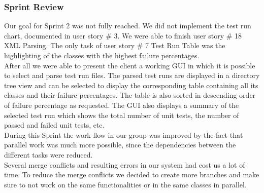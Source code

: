 \subsubsection*{Sprint Review}

Our goal for Sprint 2 was not fully reached. We did not implement the test run chart, documented in user story \# 3. We were able to finish user story \# 18 XML Parsing. The only task of user story \# 7 Test Run Table was the highlighting of the classes with the highest failure percentages. \\ 

After all we were able to present the client a working GUI in which it is possible to select and parse test run files. The parsed test runs are displayed in a directory tree view and can be selected to display the corresponding table containing all its classes and their failure percentages. The table is also sorted in descending order of failure percentage as requested. The GUI also displays a summary of the selected test run which shows the total number of unit tests, the number of passed and failed unit tests, etc. \\ 

During this Sprint the work flow in our group was improved by the fact that parallel work was much more possible, since the dependencies between the different tasks were reduced. \\ 

Several merge conflicts and resulting errors in our system had cost us a lot of time. To reduce the merge conflicts we decided to create more branches and make sure to not work on the same functionalities or in the same classes in parallel. \\ 
